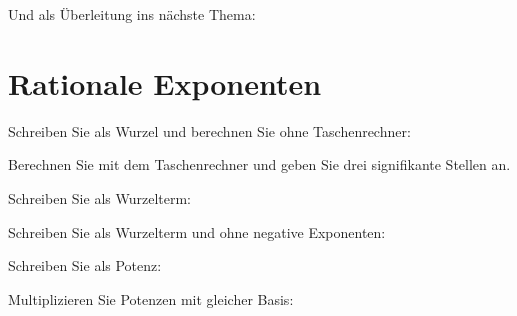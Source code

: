 \noTRAINER{\newpage}

\noTRAINER{\newpage}

Und als Überleitung ins nächste Thema:


\newpage
\section{Rationale Exponenten}

Schreiben Sie als Wurzel und berechnen Sie ohne Taschenrechner:


Berechnen Sie mit dem Taschenrechner und geben Sie drei signifikante
Stellen an.


\noTRAINER{\newpage}


Schreiben Sie als Wurzelterm:



\noTRAINER{\newpage}

\noTRAINER{\newpage}

Schreiben Sie als Wurzelterm und ohne negative Exponenten:




\noTRAINER{\newpage}

Schreiben Sie als Potenz:



\noTRAINER{\newpage}
Multiplizieren Sie Potenzen mit gleicher Basis:


